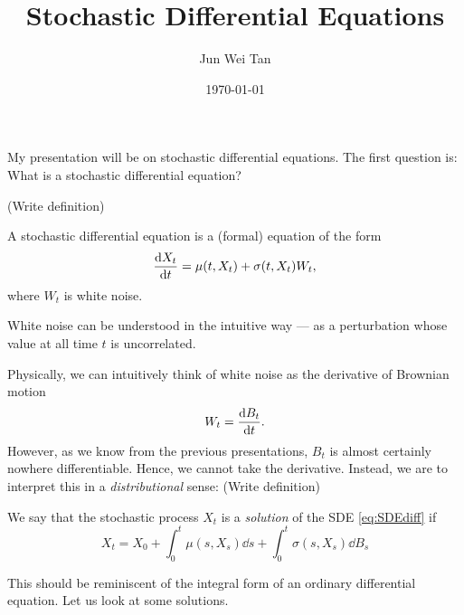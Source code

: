 \documentclass[prb,12pt]{revtex4-2}
\theoremstyle{definition}
\theoremstyle{definition}
\theoremstyle{definition}
\begin{document}
	\title{Stochastic Differential Equations}
	\author{Jun Wei Tan}
	\date{\today}
	\maketitle
	
	{\color{red} My presentation will be on stochastic differential equations. The first question is: What is a stochastic differential equation?
	
	(Write definition)}
	\begin{Definition}
		A stochastic differential equation is a (formal) equation of the form
		\begin{equation}\label{eq:SDEdiff}
			\dv{X_t}{t}=\mu(t, X_t)+\sigma(t, X_t)W_t,
		\end{equation}
		where $W_t$ is white noise. 
	\end{Definition}
	{\color{red}White noise can be understood in the intuitive way --- as a perturbation whose value at all time $t$ is uncorrelated.
	
	Physically, we can intuitively think of white noise as the derivative of Brownian motion
	\[W_t = \dv{B_t}{t}.\]
	However, as we know from the previous presentations, $B_t$ is almost certainly nowhere differentiable. Hence, we cannot take the derivative. Instead, we are to interpret this in a \emph{distributional} sense: (Write definition)}
	\begin{Definition}
		We say that the stochastic process $X_t$ is a \emph{solution} of the SDE \eqref{eq:SDEdiff} if
		\[X_t = X_0+\int_0^t \mu(s, X_s)\dd{s}+ \int_0^t \sigma(s, X_s)\dd{B_s}\]
	\end{Definition}
	{\color{red} This should be reminiscent of the integral form of an ordinary differential equation. Let us look at some solutions.}
	
\end{document}
